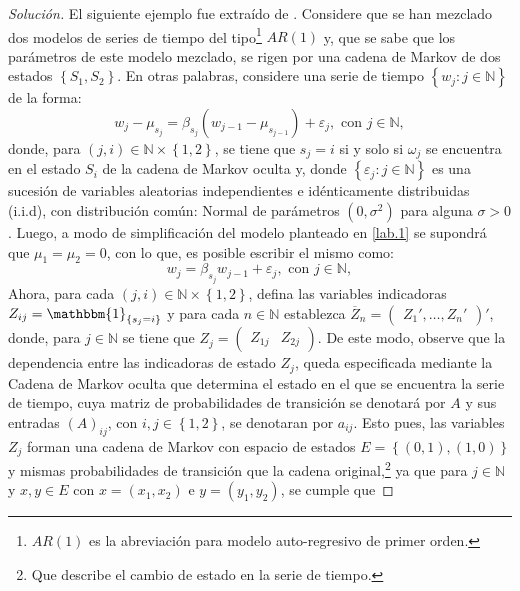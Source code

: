 \documentclass[10.5pt,notitlepage]{article}
\newenvironment{solucion}
  {\begin{proof}[Solución]}
  {\end{proof}}
\newcommand{\ee}{\varepsilon}
\newcommand{\NN}{\mathbb{N}}
\newcommand{\kis}[1]{\left\{ #1 \right\}}
\newcommand{\Matrix}[1]{\begin{pmatrix} #1 \end{pmatrix}}
\theoremstyle{plain}
\begin{document}
\setcounter{exo}{0}
\begin{exo}

\end{exo}

\begin{solucion}
El siguiente ejemplo fue extraído de \textcite{mclachlan_em_2008}. Considere que se han mezclado dos modelos de series de tiempo del tipo\footnote{\(AR(1)\) es la abreviación para modelo auto-regresivo de primer orden.} \(AR(1)\) y, que se sabe que los parámetros de este modelo mezclado, se rigen por una cadena de Markov de dos estados \(\kis{S_1,S_2}\). En otras palabras, considere una serie de tiempo \(\kis{w_{j} : j \in \NN}\) de la forma:
\begin{equation}\label{lab.1}
   w_j - \mu_{s_{j}} = \beta_{s_{j}}(w_{j-1} - \mu_{s_{j-1}}) + \ee_{j}, \text{ con } j \in \NN, 
\end{equation}
donde, para \((j,i) \in \NN\times\kis{1,2}\), se tiene que \(s_{j} = i\) si y solo si \(\omega_{j}\) se encuentra en el estado \(S_i\) de la cadena de Markov oculta y, donde \(\kis{\ee_{j} : j \in \NN}\) es una sucesión de variables aleatorias independientes e idénticamente distribuidas (i.i.d), con distribución común: Normal de parámetros \((0,\sigma^2)\) para alguna \(\sigma > 0\). Luego, a modo de simplificación del modelo planteado en \eqref{lab.1} se supondrá que \(\mu_1 = \mu_2 = 0\), con lo que, es posible escribir el mismo como:
\begin{equation}\label{lab.2}
   w_j = \beta_{s_{j}}w_{j-1} + \ee_{j}, \text{ con } j \in \NN,
\end{equation}
Ahora, para cada \((j,i) \in \NN\times\kis{1,2}\), defina las variables indicadoras
\(Z_{ij} = \mathbbm{1}_{\kis{s_j = i}}\)
y para cada \(n \in \NN\) establezca \(\overline{Z}_n = \Matrix{Z_{1}', \hdots, Z_{n}'}'\), donde, para \(j \in \NN \) se tiene que \(Z_{j} = \Matrix{Z_{1j}&Z_{2j}}\). De este modo, observe que la dependencia entre las indicadoras de estado \(Z_{j}\), queda especificada mediante la Cadena de Markov oculta que determina el estado en el que se encuentra la serie de tiempo, cuya matriz de probabilidades de transición se denotará por \(A\) y sus entradas \((A)_{ij}\), con \(i,j \in \kis{1,2}\), se denotaran por \(a_{ij}\). Esto pues, las variables \(Z_{j}\) forman una cadena de Markov con espacio de estados \(E = \kis{(0,1),(1,0)}\) y mismas probabilidades de transición que la cadena original,\footnote{Que describe el cambio de estado en la serie de tiempo.} ya que para \(j \in \NN\) y \(x,y \in E\) con \(x = (x_1, x_2)\) e \(y = (y_1,y_2)\), se cumple que 

\end{solucion}
\end{document}

